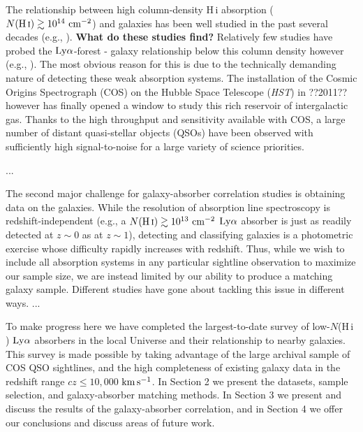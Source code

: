\documentclass[twocolumn,tighten]{aastex62}
\newcommand{\kms}{$\rm km\, s^{-1}$}
\newcommand{\HI}{\mbox{H\,{\sc i}} }
\begin{document}
The relationship between high column-density \HI absorption ($N(\HI) \gtrsim 10^{14} ~\rm cm^{-2}$) and galaxies has been well studied in the past several decades (e.g., \citealt{lanzetta1995, bowen1998, bowen2002, chen2003, chen2008, steidel2010, prochaska2011b}). \textbf{What do these studies find?} Relatively few studies have probed the $\rm Ly\alpha$-forest - galaxy relationship below this column density however (e.g., \citealt{wakker2009, french2017, bowen2002}). The most obvious reason for this is due to the technically demanding nature of detecting these weak absorption systems. The installation of the Cosmic Origins Spectrograph (COS) on the Hubble Space Telescope (\emph{HST}) in ??2011?? however has finally opened a window to study this rich reservoir of intergalactic gas.  Thanks to the high throughput and sensitivity available with COS, a large number of distant quasi-stellar objects (QSOs) have been observed with sufficiently high signal-to-noise for a large variety of science priorities. 

...


The second major challenge for galaxy-absorber correlation studies is obtaining data on the galaxies. While the resolution of absorption line spectroscopy is redshift-independent (e.g., a $N(\HI) \gtrsim 10^{13}  ~\rm cm^{-2}$ $\rm Ly\alpha$ absorber is just as readily detected at $z\sim0$ as at $z\sim 1$), detecting and classifying galaxies is a photometric exercise whose difficulty rapidly increases with redshift. Thus, while we wish to include all absorption systems in any particular sightline observation to maximize our sample size, we are instead limited by our ability to produce a matching galaxy sample. Different studies have gone about tackling this issue in different ways. ...


To make progress here we have completed the largest-to-date survey of low-$N$(\HI) $\rm Ly\alpha$ absorbers in the local Universe and their relationship to nearby galaxies. This survey is made possible by taking advantage of the large archival sample of COS QSO sightlines, and the high completeness of existing galaxy data in the redshift range $cz \leq 10,000$ \kms. In Section 2 we present the datasets, sample selection, and galaxy-absorber matching methods. In Section 3 we present and discuss the results of the galaxy-absorber correlation, and in Section 4 we offer our conclusions and discuss areas of future work.
\end{document}
